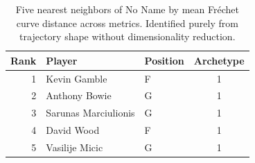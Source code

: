 \begin{table}[htbp]
  \centering\small
  \begin{tabular}{rllc}
    \toprule
    Rank & Player & Position & Archetype \\
    \midrule
    1 & Kevin Gamble & F & 1 \\
    2 & Anthony Bowie & G & 1 \\
    3 & Sarunas Marciulionis & G & 1 \\
    4 & David Wood & F & 1 \\
    5 & Vasilije Micic & G & 1 \\
    \bottomrule
  \end{tabular}
  \caption{Five nearest neighbors of No Name by mean Fr\'{e}chet curve distance across metrics. Identified purely from trajectory shape without dimensionality reduction.}
\end{table}

